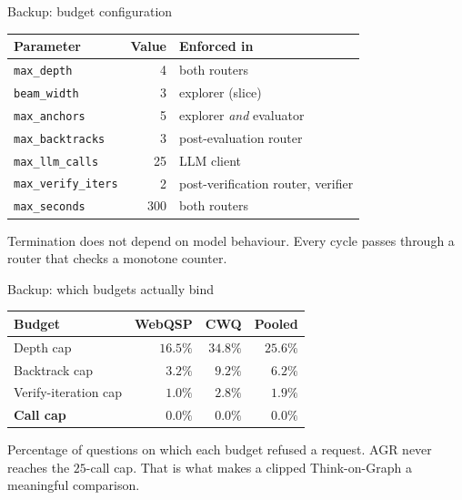 \begin{frame}{Backup: budget configuration}
  \bodyshift{-4.5pt}
  \begin{table}
    \small
    \begin{tabular}{@{}lrL{52mm}@{}}
      \toprule
      \textbf{Parameter} & \textbf{Value} & \textbf{Enforced in} \\
      \midrule
      \texttt{max\_depth}        & 4 & both routers \\
      \texttt{beam\_width}       & 3 & explorer (slice) \\
      \texttt{max\_anchors}      & 5 & explorer \emph{and} evaluator \\
      \texttt{max\_backtracks}   & 3 & post-evaluation router \\
      \texttt{max\_llm\_calls}   & 25 & LLM client \\
      \texttt{max\_verify\_iters}& 2 & post-verification router, verifier \\
      \texttt{max\_seconds}      & 300 & both routers \\
      \bottomrule
    \end{tabular}
  \end{table}
  {\small Termination does not depend on model behaviour. Every cycle passes
  through a router that checks a monotone counter.\par}
  \centrebody
\end{frame}

\begin{frame}{Backup: which budgets actually bind}
  \bodyshift{-3.5pt}
  \begin{table}
    \small
    \begin{tabular}{@{}lrrr@{}}
      \toprule
      \textbf{Budget} & \textbf{WebQSP} & \textbf{CWQ} & \textbf{Pooled} \\
      \midrule
      Depth cap        & $16.5\%$ & $34.8\%$ & $25.6\%$ \\
      Backtrack cap    & $3.2\%$  & $9.2\%$  & $6.2\%$ \\
      Verify-iteration cap & $1.0\%$ & $2.8\%$ & $1.9\%$ \\
      \textbf{Call cap} & $\mathbf{0.0\%}$ & $\mathbf{0.0\%}$
                        & $\mathbf{0.0\%}$ \\
      \bottomrule
    \end{tabular}
  \end{table}
  {\small Percentage of questions on which each budget refused a request.
  AGR never reaches the $25$-call cap. That is what makes a clipped
  Think-on-Graph a meaningful comparison.\par}
  \centrebody
\end{frame}

